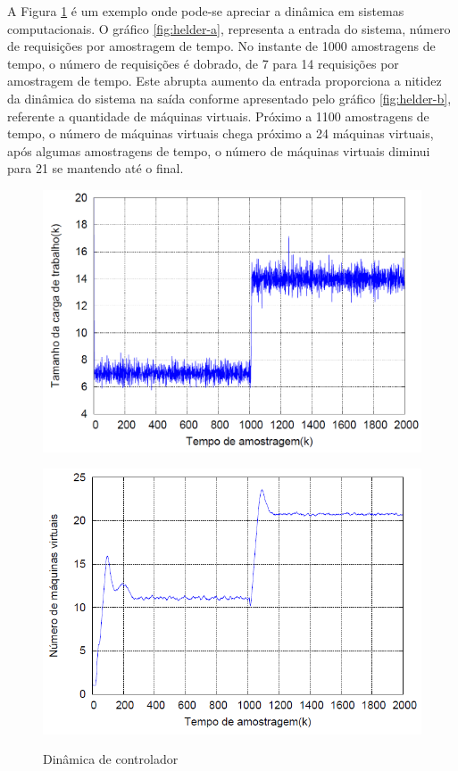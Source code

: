 A Figura \ref{fig:helder} é um exemplo onde pode-se apreciar a dinâmica em sistemas computacionais. O gráfico \ref{fig:helder-a}, representa a entrada do sistema, número de requisições por amostragem de tempo. No instante de 1000 amostragens de tempo, o número de requisições é dobrado, de 7 para 14 requisições por amostragem de tempo. Este abrupta aumento da entrada proporciona a nitidez da dinâmica do sistema na saída conforme apresentado pelo gráfico \ref{fig:helder-b}, referente a quantidade de máquinas virtuais. Próximo a 1100 amostragens de tempo, o número de máquinas virtuais chega próximo a 24 máquinas virtuais, após algumas amostragens de tempo, o número de máquinas virtuais diminui para 21 se mantendo até o final.

\begin{figure}
	\centering
	\begin{minipage}{.45\textwidth}
		\centering
		\includegraphics[scale=0.2]{images/entrada_resultado_helder_sys_segunda_orderm.png}	
		\label{fig:helder-a}
	\end{minipage}
	\begin{minipage}{.45\textwidth}
		\centering
		\includegraphics[scale=0.29]{images/resultado_helder_sys_segunda_orderm.png}	
		\label{fig:helder-b}
	\end{minipage}
	\caption{Dinâmica de controlador \cite{helder2014}}
	\label{fig:helder}
\end{figure}


